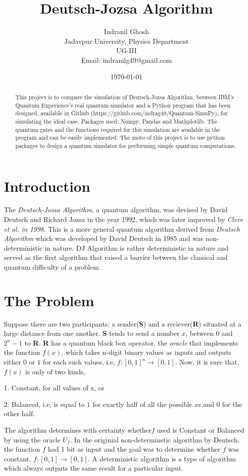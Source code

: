\documentclass{article}
\title{\textbf{Deutsch-Jozsa Algorithm}}
\author{Indranil Ghosh\\Jadavpur University, Physics Department\\ UG-III\\ Email: indranilg49@gmail.com}
\date{\today}
\begin{document}
\maketitle

\begin{abstract}
This project is to compare the simulation of Deutsch-Jozsa Algorithm, between IBM's Quantum Experience's real quantum simulator and a  Python program that  has been designed, available in Github (https://github.com/indrag49/Quantum-SimuPy), for  simulating the ideal case. Packages used: Numpy, Pandas and Mathplotlib. The quantum gates and the functions required for this simulation are available in the program and can be easily implemented. The moto of this project is to use python packages to design a quantum simulator for performing simple quantum computations.
\end{abstract}

\section{Introduction}
The \textit{Deutsch-Jozsa Algorithm}, a quantum algorithm, was devised by David Deutsch and Richard Jozsa in the year 1992, which was later improved by \textit{Cleve et al. in 1998}. This is a more general quantum algorithm derived from \textit{Deutsch Algorithm} which was developed by David Deutsch in 1985 and was non-deterministic in nature. DJ Algorithm is rather deterministic in nature and served as the first algorithm that raised a barrier between the classical and quantum difficulty of a problem.

\section{The Problem}
Suppose there are two participants: a sender(\textbf{S}) and a reciever(\textbf{R}) situated at a large distance from one another. \textbf{S} tends to send a number $x$, between $0$ and $2^n - 1$ to \textbf{R}. \textbf{R} has a quantum black box operator, the \textit{oracle} that implements the function $f(x)$, which takes n-digit binary values as inputs and outputs either $0$ or $1$ for each such values, i.e, $f: [0, 1]^n \rightarrow [0, 1]$. Now, it is sure that, $f(x)$ is only of two kinds,
\begin{center}
1. Constant, for all values of x, or \\ \par
2. Balanced, i.e, is equal to $1$ for exactly half of all the possible $x$s and $0$ for the other half.
\end{center} 
The algorithm determines with certainty whether$f$ used is Constant or Balanced by using the oracle $U_f$. In the originial non-determinstic algorithm by Deutsch, the function $f$ had 1 bit as input and the goal was to determine whether $f$ was constant. $f:[0, 1] \rightarrow [0, 1]$. A deterministic algorithm is a type of algorithm which always outputs the same result for a particular input.
\end{document}

